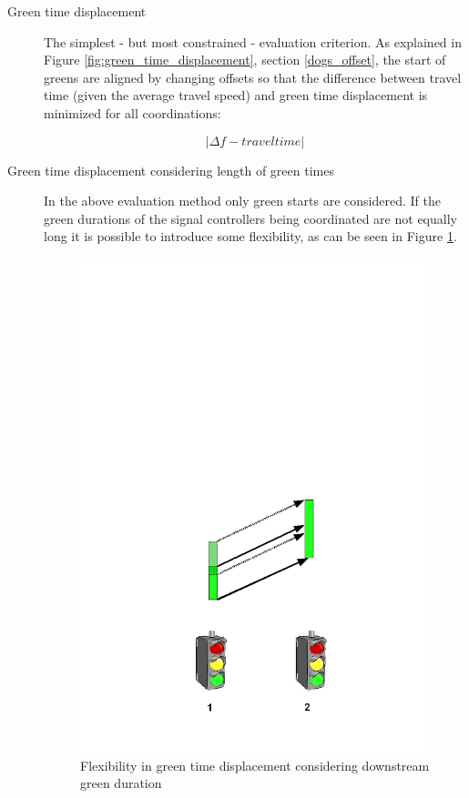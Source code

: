 \begin{description}
\item[Green time displacement]
The simplest - but most constrained - evaluation criterion. As explained in Figure \ref{fig:green_time_displacement}, section \ref{dogs_offset}, the start of greens are aligned by changing offsets so that the difference between travel time (given the average travel speed) and green time displacement is minimized for all coordinations:

$$|\Delta f - traveltime|$$

\item[Green time displacement considering length of green times]
In the above evaluation method only green starts are considered. If the green durations of the signal controllers being coordinated are not equally long it is possible to introduce some flexibility, as can be seen in Figure \ref{fig:green_time_displacement_flex}.

\begin{figure}[ht]
\centering
\includegraphics[scale=0.4]{green_time_displacement_flex.png}
\caption{Flexibility in green time displacement considering downstream green duration}
\label{fig:green_time_displacement_flex}
\end{figure}


\end{description}
